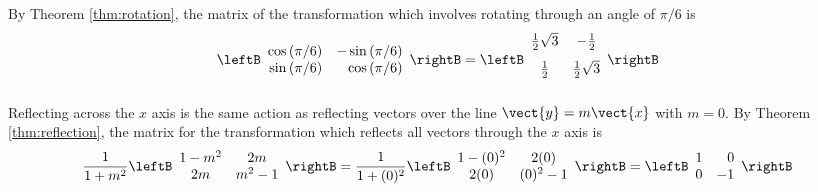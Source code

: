 \begin{solution}
By Theorem \ref{thm:rotation}, the matrix of the transformation which
involves rotating through an angle of $\pi /6$ is
\begin{equation*}
\leftB
\begin{array}{rr}
\cos \left( \pi /6\right) & -\sin \left( \pi /6\right) \\
\sin \left( \pi /6\right) & \cos \left( \pi /6\right)
\end{array}
\rightB =\leftB
\begin{array}{cc}
\vspace{0.05in}\frac{1}{2}\sqrt{3} & -\vspace{0.05in}\frac{1}{2} \\
\vspace{0.05in}\frac{1}{2} & \vspace{0.05in}\frac{1}{2}\sqrt{3}
\end{array}
\rightB
\end{equation*}

Reflecting across the $x$ axis is the same action as reflecting vectors over the line $\vect{y}=m\vect{x}$ with $m=0$. By Theorem \ref{thm:reflection}, the matrix for the transformation which reflects all vectors through the $x$
axis is
\begin{equation*}
\frac{1}{1+m^2}
\leftB
\begin{array}{cc}
1-m^2 & 2m \\
2m & m^2-1 
\end{array}
\rightB
=
\frac{1}{1+(0)^2}
\leftB
\begin{array}{cc}
1-(0)^2 & 2(0) \\
2(0) & (0)^2-1 
\end{array}
\rightB
=
\leftB
\begin{array}{rr}
1 & 0 \\
0 & -1
\end{array}
\rightB 
\end{equation*}


\end{solution}
